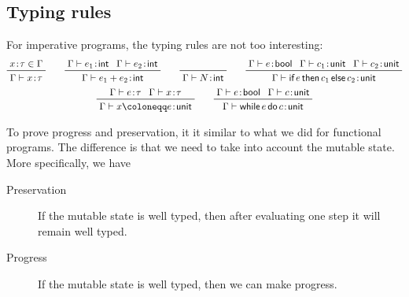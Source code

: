 \documentclass[class=scrartcl]{standalone}
\begin{document}
\subsection{Typing rules}
For imperative programs, the typing rules are not too interesting:
\begin{gather*}
  \prftree{x \of \tau \in \Gamma}
          {\Gamma \vdash x \of \tau} \qquad
  \prftree{\Gamma \vdash e_1 \of \pint}
          {\Gamma \vdash e_2 \of \pint}
          {\Gamma \vdash e_1 + e_2 \of \pint} \qquad
  \prftree{\Gamma \vdash N \of \pint} \qquad
  \prftree{\Gamma \vdash e \of \pbool}
          {\Gamma \vdash c_1 \of \punit}
          {\Gamma \vdash c_2 \of \punit}
          {\Gamma \vdash \pifthenelse{e}{c_1}{c_2} \of \punit} \\
  \prftree{\Gamma \vdash e \of \tau}
          {\Gamma \vdash x \of \tau}
          {\Gamma \vdash x \coloneqq e \of \punit} \qquad
  \prftree{\Gamma \vdash e \of \pbool}
          {\Gamma \vdash c \of \punit}
          {\Gamma \vdash \pwhiledo{e}{c} \of \punit}
\end{gather*}

To prove progress and preservation,
it it similar to what we did for functional programs.
The difference is that we need to take into account the mutable state.
More specifically, we have
\begin{description}
  \item [Preservation] If the mutable state is well typed,
        then after evaluating one step it will remain well typed.
  \item [Progress] If the mutable state is well typed,
        then we can make progress.
\end{description}
\end{document}
